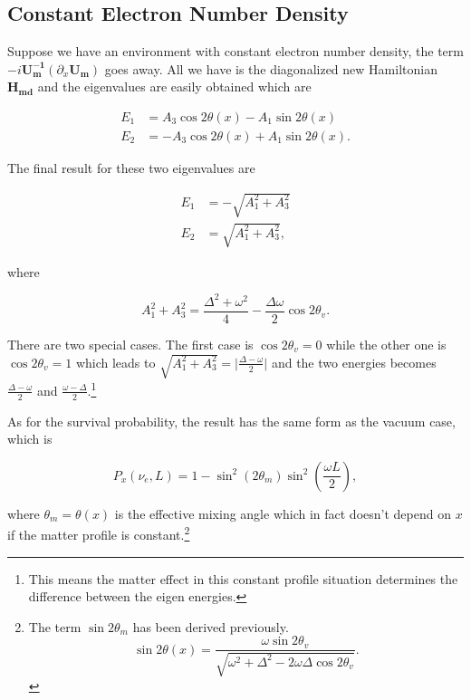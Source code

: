 \documentclass{tufte-handout}
\begin{document}
\subsection{Constant Electron Number Density}

Suppose we have an environment with constant electron number density, the term $- i \mathbf{U_m^{-1}} ( \partial_x \mathbf{U_m} )$ goes away. All we have is the diagonalized new Hamiltonian $\mathbf{H_{md}}$ and the eigenvalues are easily obtained which are

\begin{align*}
 E_1 &= A_3\cos 2\theta(x) - A_1 \sin 2\theta(x) \\ 
 E_2 & = - A_3 \cos 2\theta(x) + A_1 \sin 2\theta(x) .
\end{align*}

The final result for these two eigenvalues are

\begin{align*}
E_1 &= -\sqrt{A_1^2 + A_3^2} \\
E_2 &= \sqrt{A_1^2 + A_3^2},
\end{align*}

where

\begin{equation*}
A_1^2 + A_3^2 = \frac{\Delta^2 + \omega^2 }{4} - \frac{\Delta \omega }{2} \cos 2\theta_v.
\end{equation*}


There are two special cases. The first case is $\cos 2\theta_v=0$ while the other one is $\cos 2\theta_v = 1$ which leads to $\sqrt{A_1^2+A_3^2} = \lvert\frac{\Delta - \omega}{2} \rvert$ and the two energies becomes $\frac{\Delta - \omega}{2}$ and $\frac{\omega - \Delta}{2} $.\footnote{This means the matter effect in this constant profile situation determines the difference between the eigen energies.}


As for the survival probability, the result has the same form as the vacuum case, which is

\begin{equation*}
P_x(\nu_e,L) = 1 - \sin^2(2\theta_m)\sin^2\left( \frac{\omega L}{2} \right) ,
\end{equation*}

where $\theta_m = \theta(x)$ is the effective mixing angle which in fact doesn't depend on $x$ if the matter profile is constant.\footnote{The term $\sin 2\theta_m$ has been derived previously.
\begin{equation*}
\sin 2\theta(x)  = \frac{\omega\sin 2\theta_v}{\sqrt{ \omega^2+\Delta^2 - 2 \omega \Delta\cos 2\theta_v }}.
\end{equation*}
}
\end{document}
